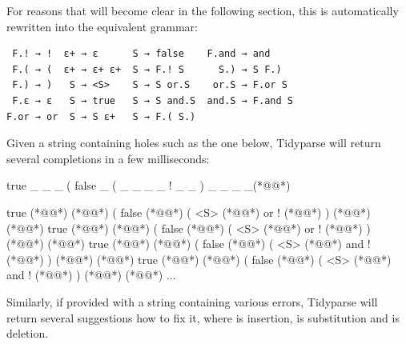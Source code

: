 \documentclass[sigplan,nonacm]{acmart}\settopmatter{printfolios=false,printccs=false,printacmref=false}
\begin{document}
\noindent For reasons that will become clear in the following section, this is automatically rewritten into the equivalent grammar:

\begin{verbatim}
 F.! → !  ε+ → ε      S → false    F.and → and
 F.( → (  ε+ → ε+ ε+  S → F.! S      S.) → S F.)
 F.) → )   S → <S>    S → S or.S    or.S → F.or S
 F.ε → ε   S → true   S → S and.S  and.S → F.and S
F.or → or  S → S ε+   S → F.( S.)
\end{verbatim}


%

\noindent Given a string containing holes such as the one below, Tidyparse will return several completions in a few milliseconds:

\begin{tidyinput}
true _ _ _ ( false _ ( _ _ _ _ ! _ _ ) _ _ _ _(*@\caret{ }@*)
\end{tidyinput}

\begin{tidyoutput}
true (*@@*) (*@\hlorange{!}@*) ( false (*@@*) ( <S> (*@\hlorange{)}@*) or ! (*@@*) ) (*@@*) (*@@*)
true (*@@*) (*@\hlorange{!}@*) ( false (*@@*) ( <S> (*@\hlorange{)}@*) or ! (*@@*) ) (*@@*) (*@@*)
true (*@@*) (*@\hlorange{!}@*) ( false (*@@*) ( <S> (*@\hlorange{)}@*) and ! (*@@*) ) (*@@*) (*@@*)
true (*@@*) (*@\hlorange{!}@*) ( false (*@@*) ( <S> (*@\hlorange{)}@*) and ! (*@@*) ) (*@@*) (*@@*)
...
\end{tidyoutput}

\noindent Similarly, if provided with a string containing various errors, Tidyparse will return several suggestions how to fix it, where  is insertion,  is substitution and  is deletion.
\end{document}

